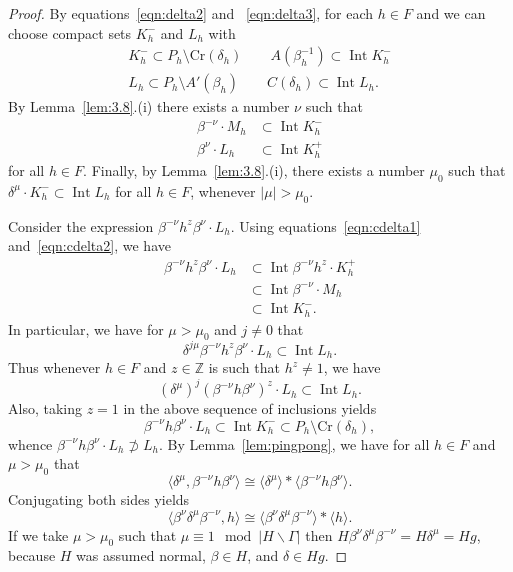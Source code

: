 \documentclass{amsart}
\theoremstyle{plain}
\theoremstyle{definition}
\theoremstyle{remark}
\DeclareMathOperator{\Int}{Int}
\providecommand{\abs}[1]{\lvert#1\rvert}
\begin{document}
\begin{proof}
By
equations~\eqref{eqn:delta2} and~ \eqref{eqn:delta3}, for each $h \in F$ and we can choose compact sets
$K_{h}^{-}$ and $L_{h}$ with
\begin{gather*}
K_{h}^{-} \subset P_{h}\setminus \mathrm{Cr}(\delta_{h})\qquad A(\beta_{h}^{-1})\subset \Int K_{h}^{-}\\
L_{h } \subset P_{h} \setminus A'(\beta_{h})\qquad C(\delta_{h}) \subset \Int L_{h}.
\end{gather*}
By Lemma~\ref{lem:3.8}.(i) there exists a number $\nu$ such that
\begin{align}
\beta^{-\nu}\cdot M_{h} &\subset \Int K_{h}^{-}\label{eqn:cdelta1}\\
\beta^{\nu}\cdot L_{h}&\subset \Int K_{h}^{+}\label{eqn:cdelta2}
\end{align}
for all $h \in F$. Finally, by Lemma~\ref{lem:3.8}.(i), there exists a number $\mu_{0}$ such that
$\delta^{\mu}\cdot K_{h}^{-} \subset \Int L_{h}$ for all $h \in F$, whenever $\abs{\mu} >
\mu_{0}$.

Consider the expression $\beta^{-\nu}h^{z}\beta^{\nu}\cdot L_{h}$. Using
equations~\eqref{eqn:cdelta1} and~\eqref{eqn:cdelta2}, we have
\begin{align*}
\beta^{-\nu}h^{z}\beta^{\nu}\cdot L_{h}
&\subset \Int \beta^{-\nu}h^{z}\cdot K_{h}^{+}\\
&\subset \Int \beta^{-\nu}\cdot M_{h}\\
&\subset \Int K_{h}^{-}.
\end{align*}
In particular, we have for $\mu > \mu_{0}$ and $j \neq 0$ that
$$\delta^{j\mu}\beta^{-\nu}h^{z}\beta^{\nu}\cdot L_{h} \subset \Int L_{h}.$$
Thus whenever $h \in F$ and $z \in \mathbb{Z}$ is such that $h^{z} \neq 1$, we have
$$(\delta^{\mu})^{j}(\beta^{-\nu}h\beta^{\nu})^{z}\cdot L_{h}
\subset \Int L_{h}.$$
Also, taking $z = 1$ in the above sequence of inclusions yields $$\beta^{-\nu}h\beta^{\nu}\cdot L_{h}
\subset \Int K_{h}^{-} \subset P_{h}\setminus \mathrm{Cr}(\delta_{h}),$$
whence $\beta^{-\nu}h\beta^{\nu} \cdot L_{h} \not\supset L_{h}$.
By Lemma~\ref{lem:pingpong}, we have for all $h \in F$ and $\mu > \mu_{0}$ that
$$\langle \delta^{\mu}, \beta^{-\nu}h\beta^{\nu}\rangle
\cong \langle\delta^{\mu}\rangle * \langle\beta^{-\nu}h\beta^{\nu}\rangle.$$
Conjugating both sides yields
$$\langle \beta^{\nu}\delta^{\mu}\beta^{-\nu}, h\rangle
\cong \langle\beta^{\nu}\delta^{\mu}\beta^{-\nu}\rangle * \langle h\rangle.$$
If we take $\mu >\mu_{0}$ such that $\mu \equiv 1 \mod{\abs{H\backslash\Gamma}}$
then $H\beta^{\nu}\delta^{\mu}\beta^{-\nu} = H\delta^{\mu} = Hg$, because $H$ was assumed
normal, $\beta \in H$, and $\delta \in Hg$.
\end{proof}
\end{document}
